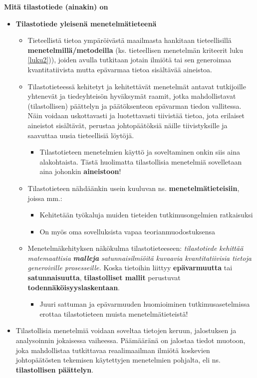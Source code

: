 \documentclass[
]{book}
\providecommand{\tightlist}{%
  \setlength{\itemsep}{0pt}\setlength{\parskip}{0pt}}
\begin{document}
\hfill\break
\hfill\break

\textbf{Mitä tilastotiede (ainakin) on}

\begin{itemize}
\tightlist
\item
  \textbf{Tilastotiede yleisenä menetelmätieteenä}

  \begin{itemize}
  \tightlist
  \item
    Tieteellistä tietoa ympäröivästä maailmasta hankitaan tieteellisillä \textbf{menetelmillä/metodeilla} (ks. tieteellisen menetelmän kriteerit luku \ref{luku2})), joiden avulla tutkitaan jotain ilmiötä tai sen generoimaa kvantitatiivista mutta epävarmaa tietoa sisältävää aineistoa.
  \item
    Tilastotieteessä kehitetyt ja kehitettävät menetelmät antavat tutkijoille yhtenevät ja tiedeyhteisön hyväksymät raamit, jotka mahdollistavat (tilastollisen) päättelyn ja päätöksenteon epävarman tiedon vallitessa. Näin voidaan uskottavasti ja luotettavasti tiivistää tietoa, jota erilaiset aineistot sisältävät, perustaa johtopäätöksiä näille tiivistyksille ja saavuttaa uusia tieteellisiä löytöjä.

    \begin{itemize}
    \tightlist
    \item
      Tilastotieteen menetelmien käyttö ja soveltaminen onkin siis aina alakohtaista. Tästä huolimatta tilastollisia menetelmiä sovelletaan aina johonkin \textbf{aineistoon}!
    \end{itemize}
  \item
    Tilastotieteen nähdäänkin usein kuuluvan ns. \textbf{menetelmätieteisiin}, joissa mm.:

    \begin{itemize}
    \tightlist
    \item
      Kehitetään työkaluja muiden tieteiden tutkimusongelmien ratkaisuksi
    \item
      On myös oma sovelluksista vapaa teorianmuodostuksensa
    \end{itemize}
  \item
    Menetelmäkehityksen näkökulma tilastotieteeseen: \emph{tilastotiede kehittää matemaattisia} \textbf{\emph{malleja}} \emph{satunnaisilmiöitä kuvaavia kvantitatiivisia tietoja generoiville prosesseille.} Koska tietoihin liittyy \textbf{epävarmuutta} tai \textbf{satunnaisuutta}, \textbf{tilastolliset mallit} perustuvat \textbf{todennäköisyyslaskentaan}.

    \begin{itemize}
    \tightlist
    \item
      Juuri sattuman ja epävarmuuden huomioiminen tutkimusasetelmissa erottaa tilastotieteen muista menetelmätieteistä!
    \end{itemize}
  \end{itemize}
\item
  Tilastollisia menetelmiä voidaan soveltaa tietojen keruun, jalostuksen ja analysoinnin jokaisessa vaiheessa. Päämääränä on jalostaa tiedot muotoon, joka mahdollistaa tutkittavaa reaalimaailman ilmiötä koskevien johtopäätösten tekemisen käytettyjen menetelmien pohjalta, eli ns. \textbf{tilastollisen päättelyn}.


\end{itemize}
\end{document}
